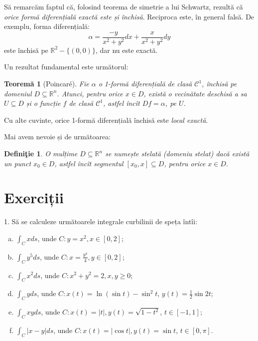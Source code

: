 \documentclass[11pt,a4paper]{article}
\newcommand\kal{\mathcal}
\newcommand\seq{\subseteq}
\newcommand\RR{\mathbb{R}}
\theoremstyle{dotless}
\newtheorem{theorem}{Teorem\u{a}}[section]
\theoremstyle{dotlessdr}
\newtheorem{definition}{Defini\c{t}ie}[section]
\begin{document}
Să remarcăm faptul că, folosind teorema de simetrie a lui Schwartz, rezultă
că \emph{orice formă diferențială exactă este și închisă}. Reciproca este,
în general falsă. De exemplu, forma diferențială:
\[
  \alpha = \frac{-y}{x^2 + y^2} dx + \frac{x}{x^2 + y^2} dy
\]
este închisă pe $\RR^2 - \{(0, 0)\}$, dar nu este exactă.

Un rezultat fundamental este următorul:

\begin{theorem}[Poincar\'{e}]\label{thm:poinc}
  Fie $\alpha$ o 1-formă diferențială de clasă $\kal{C}^1$, închisă pe domeniul
  $D \seq \RR^n$. Atunci, pentru orice $x \in D$, există o vecinătate deschisă a
  sa $U \seq D$ și o funcție $f$ de clasă $\kal{C}^1$, astfel încît $Df = \alpha$,
  \emph{pe $U$}.
\end{theorem}

Cu alte cuvinte, orice 1-formă diferențială închisă este \emph{local exactă}.

Mai avem nevoie și de următoarea:

\begin{definition}\label{def:stelat}
  O mulțime $D \seq \RR^n$ se numește \emph{stelată} (\emph{domeniu stelat}) dacă
  există un punct $x_0 \in D$, astfel încît segmentul $[x_0, x] \seq D$, pentru orice
  $x \in D$.
\end{definition}


\section{Exerciții}
\label{sec:exc}

1. Să se calculeze următoarele integrale curbilinii de speța întîi:
\begin{enumerate}[(a)]
\item $\int_C x ds$, unde $C: y = x^2, x \in [0, 2]$;
\item $\int_C y^5 ds$, unde $C: x = \frac{y^4}{4}, y \in [0, 2]$;
\item $\int_C x^2 ds$, unde $C: x^2 + y^2 = 2, x, y \geq 0$;
\item $\int_C yds$, unde $C: x(t) = \ln(\sin t) - \sin^2 t$,
  $y(t) = \frac{1}{2} \sin 2t$;
\item $\int_C xyds$, unde $C: x(t) = |t|, y(t) = \sqrt{1 - t^2}$, $t \in [-1, 1]$;
\item $\int_C |x - y| ds$, unde $C: x(t) = |\cos t|, y(t) = \sin t$, $t \in [0, \pi]$.
\end{enumerate}
\end{document}
